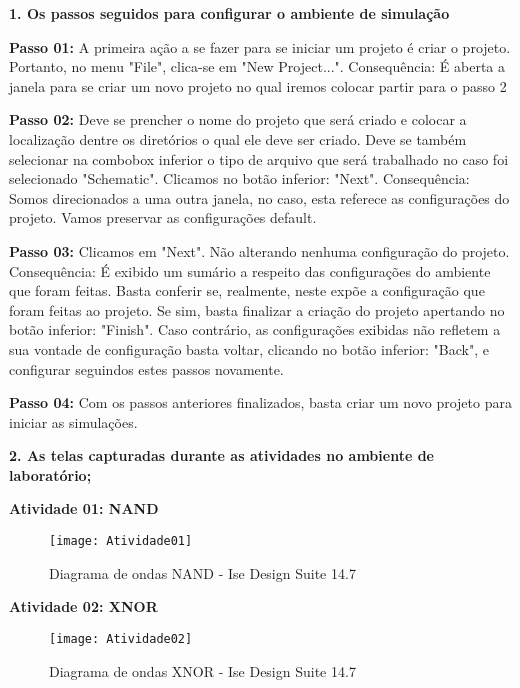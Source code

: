\documentclass[12pts]{article}
\begin{document}
\textbf{1. Os passos seguidos para configurar o ambiente de simulação}

\singlespacing

\textbf{Passo 01:} A primeira ação a se fazer para se iniciar um projeto é criar o projeto. Portanto, no menu "File", clica-se em "New Project...". 
Consequência: É aberta a janela para se criar um novo projeto no qual iremos colocar partir para o passo 2
\singlespacing

\textbf{Passo 02:} Deve se prencher o nome do projeto que será criado e colocar a localização dentre os diretórios o qual ele deve ser criado. Deve se também selecionar na combobox inferior o tipo de arquivo que será trabalhado no caso foi selecionado "Schematic". Clicamos no botão inferior: "Next".
Consequência: Somos direcionados a uma outra janela, no caso, esta referece as configurações do projeto. Vamos preservar as configurações default.
\singlespacing

\textbf{Passo 03:} Clicamos em "Next". Não alterando nenhuma configuração do projeto. 
Consequência: É exibido um sumário a respeito das configurações do ambiente que foram feitas. Basta conferir se, realmente, neste expõe a configuração que foram feitas ao projeto. Se sim, basta finalizar a criação do projeto apertando no botão inferior: "Finish". Caso contrário, as configurações exibidas não refletem a sua vontade de configuração basta voltar, clicando no botão inferior: "Back", e configurar seguindos estes passos novamente. 
\singlespacing

\textbf{Passo 04:} Com os passos anteriores finalizados, basta criar um novo projeto para iniciar as simulações.
\singlespacing

\newpage
\textbf{2. As telas capturadas durante as atividades no ambiente de laboratório;}
\singlespacing

\textbf{Atividade 01: NAND}

\begin{figure}[!htb]
  \centering
  \texttt{[image: Atividade01]}
  \caption{Diagrama de ondas NAND - Ise Design Suite 14.7}
  \label{figRotulo}
\end{figure}

\newpage
\textbf{Atividade 02: XNOR}

\begin{figure}[!htb]
  \centering
  \texttt{[image: Atividade02]}
  \caption{Diagrama de ondas XNOR - Ise Design Suite 14.7}
  \label{figRotulo}
\end{figure}
\singlespacing
\end{document}
